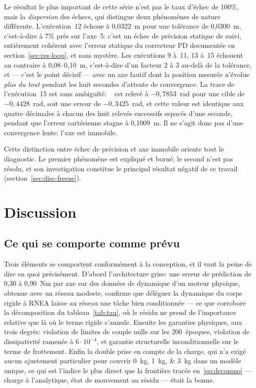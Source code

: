 \documentclass[a4paper, oneside]{article}
\newcommand{\code}[1]{%
    \mbox{\ttfamily\small%
        \detokenize{#1}%
    }%
}
\begin{document}
Le résultat le plus important de cette série n'est pas le taux d'échec de
100\%, mais la \emph{dispersion} des échecs, qui distingue deux phénomènes de
nature différente. L'exécution~12 échoue à 0{,}0322~m pour une tolérance de
0{,}0300~m, c'est-à-dire à 7\% près sur l'axe~5: c'est un échec de précision
statique de suivi, entièrement cohérent avec l'erreur statique du correcteur PD
documentée en section~\ref{sec:res-loop}, et sans mystère. Les exécutions 9
à~11, 13 à~15 échouent au contraire à 0{,}08--0{,}10~m, c'est-à-dire d'un
facteur 2 à 3 au-delà de la tolérance, et — c'est le point décisif — avec un axe
fautif dont la position mesurée n'évolue \emph{plus du tout} pendant les huit
secondes d'attente de convergence. La trace de l'exécution~15 est sans
ambiguïté: \code{panda_joint7} est relevé à $-0{,}7853$~rad pour une cible de
$-0{,}4428$~rad, soit une erreur de $-0{,}3425$~rad, et cette valeur est
identique aux quatre décimales à chacun des huit relevés successifs espacés
d'une seconde, pendant que l'erreur cartésienne stagne à 0{,}1009~m. Il ne
s'agit donc pas d'une convergence lente: l'axe est immobile.

Cette distinction entre \og échec de précision \fg{} et \og axe immobile \fg{}
oriente tout le diagnostic. Le premier phénomène est expliqué et borné; le
second n'est pas résolu, et son investigation constitue le principal résultat
négatif de ce travail (section~\ref{sec:disc-freeze}).

\section{Discussion}
\label{sec:discussion}

\subsection{Ce qui se comporte comme prévu}

Trois éléments se comportent conformément à la conception, et il vaut la peine
de dire en quoi précisément. D'abord l'architecture grise: une erreur de
prédiction de 0{,}30 à 0{,}90~Nm par axe sur des données de dynamique d'un
moteur physique, obtenue avec un réseau modeste, confirme que déléguer la
dynamique du corps rigide à RNEA laisse au réseau une tâche bien conditionnée —
ce que corrobore la décomposition du tableau~\ref{tab:tau}, où le résidu ne
prend de l'importance relative que là où le terme rigide s'annule. Ensuite les
garanties physiques, aux trois degrés: violation de limites de couple nulle sur
les 200~époques, violation de dissipativité ramenée à $6\cdot 10^{-4}$, et
garantie structurelle inconditionnelle sur le terme de frottement. Enfin la
double prise en compte de la charge, qui n'a exigé aucun ajustement particulier
pour couvrir \SIlist{0;1;3}{kg} dans un modèle unique, ce qui est l'indice le plus
direct que la frontière tracée en~\eqref{eq:decompo} — charge à l'analytique,
état de mouvement au résidu — était la bonne.
\end{document}
